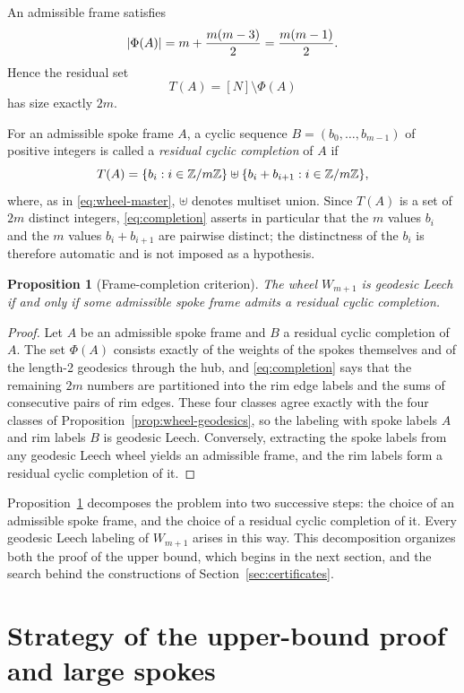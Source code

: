 \documentclass[11pt]{article}
\newtheorem{proposition}[theorem]{Proposition}
\theoremstyle{definition}
\theoremstyle{remark}
\numberwithin{equation}{section}
\newcommand{\Z}{\mathbb{Z}}
\newcommand{\dd}{\mathbin{\uplus}}
\DeclarePairedDelimiter{\set}{\{}{\}}
\DeclarePairedDelimiter{\abs}{\lvert}{\rvert}
\begin{document}
An admissible frame satisfies
\[
  \abs{\Phi(A)}=m+\frac{m(m-3)}2=\frac{m(m-1)}2.
\]
Hence the residual set
\[
  T(A)=[N]\setminus\Phi(A)
\]
has size exactly $2m$.

For an admissible spoke frame $A$, a cyclic sequence $B=(b_0,\ldots,b_{m-1})$ of positive integers is called a \emph{residual cyclic completion} of $A$ if
\begin{equation}\label{eq:completion}
  T(A)=\set{b_i:i\in\Z/m\Z}
  \dd
  \set{b_i+b_{i+1}:i\in\Z/m\Z},
\end{equation}
where, as in \eqref{eq:wheel-master}, $\dd$ denotes multiset union. Since $T(A)$ is a set of $2m$ distinct integers, \eqref{eq:completion} asserts in particular that the $m$ values $b_i$ and the $m$ values $b_i+b_{i+1}$ are pairwise distinct; the distinctness of the $b_i$ is therefore automatic and is not imposed as a hypothesis.

\begin{proposition}[Frame-completion criterion]\label{thm:frame-completion}
The wheel $W_{m+1}$ is geodesic Leech if and only if some admissible spoke frame admits a residual cyclic completion.
\end{proposition}

\begin{proof}
Let $A$ be an admissible spoke frame and $B$ a residual cyclic completion of $A$. The set $\Phi(A)$ consists exactly of the weights of the spokes themselves and of the length-2 geodesics through the hub, and \eqref{eq:completion} says that the remaining $2m$ numbers are partitioned into the rim edge labels and the sums of consecutive pairs of rim edges. These four classes agree exactly with the four classes of Proposition~\ref{prop:wheel-geodesics}, so the labeling with spoke labels $A$ and rim labels $B$ is geodesic Leech. Conversely, extracting the spoke labels from any geodesic Leech wheel yields an admissible frame, and the rim labels form a residual cyclic completion of it.
\end{proof}

Proposition~\ref{thm:frame-completion} decomposes the problem into two successive steps: the choice of an admissible spoke frame, and the choice of a residual cyclic completion of it. Every geodesic Leech labeling of $W_{m+1}$ arises in this way. This decomposition organizes both the proof of the upper bound, which begins in the next section, and the search behind the constructions of Section~\ref{sec:certificates}.

\section{Strategy of the upper-bound proof and large spokes}\label{sec:strategy}
\end{document}
